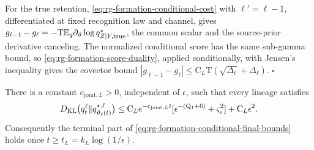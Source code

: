For the true retention, \cref{eq:rg-formation-conditional-cost} with
\(\ell'=\ell-1\), differentiated at fixed recognition law and channel, gives
\(g_{\ell-1}-g_\ell=-\mathrm T\mathbb E_q\partial_\vartheta\log q^\star_{Z\mid Y,\mathrm{true}}\),
the common scalar and the source-prior derivative canceling. The normalized
conditional score has the same sub-gamma bound, so
\cref{eq:rg-formation-score-duality}, applied conditionally, with Jensen's
inequality gives the covector bound
\(|g_{\ell-1}-g_\ell|\le\mathrm C_L\mathrm T(\sqrt{\Delta_\ell}+\Delta_\ell)\).
\(\square\)

There is a constant \(\mathrm c_{\mathrm{joint},L}>0\), independent of
\(\epsilon\), such that every lineage satisfies
\begin{equation}
 D_{\mathrm{KL}}\bigl(q_t^\ell\Vert q^{\star,\ell}_{\vartheta_\ell(t)}\bigr)
 \le \mathrm C_L e^{-\mathrm c_{\mathrm{joint},L}t}
           [\epsilon^{-(\mathrm Q_1+6)}+\varsigma_\epsilon^2]
       +\mathrm C_L\epsilon^2.
 \label{eq:rg-formation-terminal-joint-bound}
\end{equation}
Consequently the terminal part of
\cref{eq:rg-formation-conditional-final-bounds} holds once
\(t\ge t_L=k_L\log(1/\epsilon)\). 

